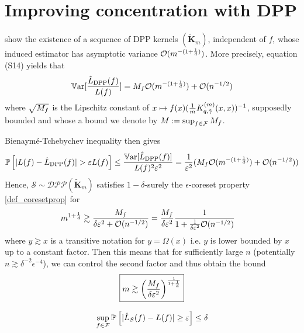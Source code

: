 \section{Improving concentration with DPP}

\cite{bardenet2021sgddpp} show the existence of a sequence of DPP kernels $(\tilde{\boldsymbol K}_m)$, independent of $f$, whose induced estimator has asymptotic variance $\mathcal{O}( m ^{-(1+\frac 1 d)})$. More precisely, 	
equation (S14) yields that 
\begin{equation}
	\operatorname{\mathbb V ar}[\frac{\hat L_{\textrm{DPP}}(f)}{L(f)}] = M_f \mathcal{O}( m ^{-(1+\frac 1 d)}) +\mathcal{O}( n^{-1/2})
\end{equation}
where $\sqrt{M_f}$ is the Lipschitz constant of $x \mapsto f(x) (\frac{1}{m} K^{(m)}_{q, \tilde \gamma}(x,x))^{-1}$, supposedly bounded and whose a bound we denote by $M := \sup_{f \in \mathcal{F}}M_f$.

Bienaym\'e-Tchebychev inequality then gives
\begin{equation}
	\PP \left[|L(\query)-\hat L_{\textrm{DPP}}(\query)|>\epsilon L(\query)\right] \leq \frac{\Var[ \hat L_{\textrm{DPP}}(\query) ] }{L(\query)^{2}\varepsilon ^{2}} = \frac {1} {\epsilon^2}(M_\query \OO( m ^{-(1+\frac 1 d)}) + \OO( n^{-1/2}))
\end{equation}
Hence, $\mathcal{S} \sim \mathcal{DPP}(\tilde{\boldsymbol K}_m)$ satisfies $1-\delta$-surely the $\epsilon$-coreset property \ref{def_coresetprop} for
\begin{align}
	m^{1+\frac 1 d} &\gtrsim \frac{M_f}{\delta \varepsilon^2 + \mathcal{O}(n^{-1/2})} = \frac {M_f} {\delta\varepsilon^2} \frac{1}{1 + \frac{1}{\delta \varepsilon^2}\mathcal{O}(n^{-1/2})}
\end{align} 
where $y \gtrsim x$ is a transitive notation for $y = \Omega(x)$ i.e. $y$ is lower bounded by $x$ up to a constant factor.
Then this means that for sufficiently large $n$ (potentially $n\gtrsim \delta^{-2} \epsilon^{-4}$), we can control the second factor and thus obtain the bound
\begin{equation}
	\boxed{m \gtrsim \left(\frac{M_f}{\delta\varepsilon^2} \right)^{\frac{1}{1+\frac 1 d}} }
	\label{eqn_fixedtheta}
\end{equation}
\begin{lemma}
	\begin{equation}
		\sup_{f \in \mathcal{F}} \mathbb{P}_{}\left[\lvert \hat{L}_{\mathcal{S}}(f) - L(f) \rvert \geq \varepsilon\right] \leq \delta
	\end{equation}
\end{lemma}



